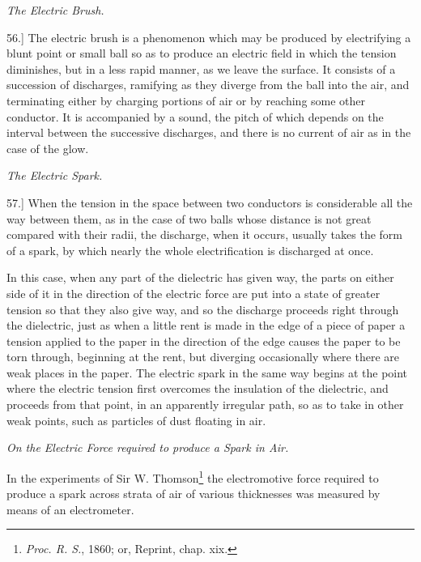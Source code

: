 \documentclass[11pt,a4paper]{article}
\begin{document}
\begin{center}
\textit{The Electric Brush.}
\end{center}

56.] The electric brush is a phenomenon which may be produced
by electrifying a blunt point or small ball so as to produce
an electric field in which the tension diminishes, but in a less rapid
manner, as we leave the surface. It consists of a succession of
discharges, ramifying as they diverge from the ball into the air,
and terminating either by charging portions of air or by reaching
some other conductor. It is accompanied by a sound, the pitch of
which depends on the interval between the successive discharges,
and there is no current of air as in the case of the glow.

\clearpage
\setcounter{footnote}{0}

\begin{center}
\textit{The Electric Spark.}
\end{center}

57.] When the tension in the space between two conductors is
considerable all the way between them, as in the case of two balls
whose distance is not great compared with their radii, the discharge,
when it occurs, usually takes the form of a spark, by which nearly
the whole electrification is discharged at once.

In this case, when any part of the dielectric has given way,
the parts on either side of it in the direction of the electric force
are put into a state of greater tension so that they also give way,
and so the discharge proceeds right through the dielectric, just as
when a little rent is made in the edge of a piece of paper a tension
applied to the paper in the direction of the edge causes the paper to
be torn through, beginning at the rent, but diverging occasionally
where there are weak places in the paper. The electric spark in
the same way begins at the point where the electric tension first
overcomes the insulation of the dielectric, and proceeds from that
point, in an apparently irregular path, so as to take in other weak
points, such as particles of dust floating in air.

\begin{center}
\textit{On the Electric Force required to produce a Spark in Air.}
\end{center}

In the experiments of Sir W. Thomson\footnote{\textit{Proc. R. S.}, 1860;
or, Reprint, chap. xix.} the electromotive force
required to produce a spark across strata of air of various thicknesses
was measured by means of an electrometer.
\end{document}
